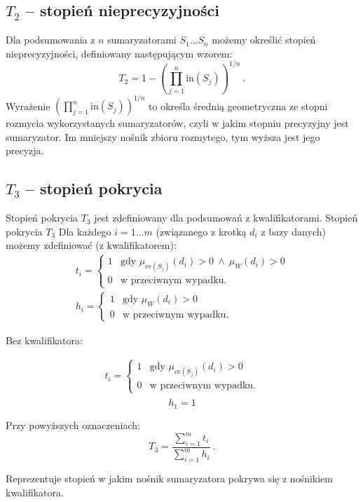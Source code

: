 \documentclass{classrep}
\begin{document}
\subsection{\(T_2\) -- stopień nieprecyzyjności}
Dla podsumowania z \(n\) sumaryzatorami \(S_1 \ldots S_n\) możemy określić stopień nieprecyzyjności,
definiowany następującym wzorem:
\[T_2 = 1 - \left(\prod_{j=1}^{n} \mathrm{in}(S_j)\right)^{1/n} ~\mbox{.}\]
Wyrażenie \(\left(\prod_{j=1}^{n} \mathrm{in}(S_j)\right)^{1/n}\) to określa średnią geometryczna ze stopni rozmycia wykorzystanych sumaryzatorów, czyli w jakim stopniu precyzyjny jest sumaryzator. Im mniejszy nośnik zbioru rozmytego, tym wyższa jest jego precyzja.
   

\subsection{\(T_3\) -- stopień pokrycia}
Stopień pokrycia \(T_3\) jest zdefiniowany dla podsumowań z kwalifikatorami. Stopień pokrycia $T_3$ 
Dla każdego \(i=1\ldots m\) (związanego z krotką \(d_i\) z bazy
danych) możemy zdefiniować (z kwalifikatorem):
\[
\begin{array}{l}
t_i = \begin{cases}
1 & \mbox{gdy } \mu_{\mathrm{ce}(S_j)}(d_i) > 0 ~ \wedge ~ \mu_{W}(d_i) > 0 \\
0 & \mbox{w przeciwnym wypadku.}
\end{cases} \\
h_i = \begin{cases}
1 & \mbox{gdy } \mu_{W}(d_i) > 0 \\
0 & \mbox{w przeciwnym wypadku.}
\end{cases}
\end{array}\]

Bez kwalifikatora:

\[
\begin{array}{l}
t_i = \begin{cases}
1 & \mbox{gdy } \mu_{\mathrm{ce}(S_j)}(d_i) > 0  \\
0 & \mbox{w przeciwnym wypadku.}
\end{cases} \\
\end{array}\]
\[h_1 = 1\]

Przy powyższych oznaczeniach:
\[T_3 = \frac{\sum_{i=1}^{m} t_i}{\sum_{i=1}^{m} h_i} ~\mbox{.}\]

Reprezentuje stopień w jakim nośnik sumaryzatora pokrywa się z nośnikiem kwalifikatora.
\end{document}
